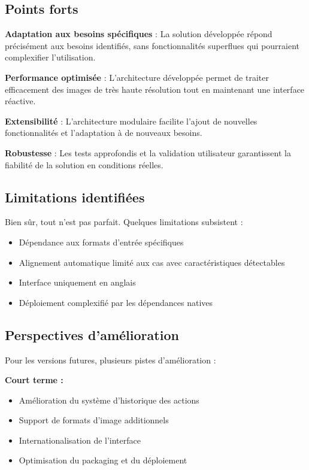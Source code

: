 \documentclass[11pt,a4paper]{report}
\begin{document}
\subsection{Points forts}

\textbf{Adaptation aux besoins spécifiques} : La solution développée répond précisément aux besoins identifiés, sans fonctionnalités superflues qui pourraient complexifier l'utilisation.

\textbf{Performance optimisée} : L'architecture développée permet de traiter efficacement des images de très haute résolution tout en maintenant une interface réactive.

\textbf{Extensibilité} : L'architecture modulaire facilite l'ajout de nouvelles fonctionnalités et l'adaptation à de nouveaux besoins.

\textbf{Robustesse} : Les tests approfondis et la validation utilisateur garantissent la fiabilité de la solution en conditions réelles.

\subsection{Limitations identifiées}

Bien sûr, tout n'est pas parfait. Quelques limitations subsistent :

\begin{itemize}
\item Dépendance aux formats d'entrée spécifiques
\item Alignement automatique limité aux cas avec caractéristiques détectables
\item Interface uniquement en anglais
\item Déploiement complexifié par les dépendances natives
\end{itemize}

\subsection{Perspectives d'amélioration}

Pour les versions futures, plusieurs pistes d'amélioration :

\textbf{Court terme :}
\begin{itemize}
\item Amélioration du système d'historique des actions
\item Support de formats d'image additionnels
\item Internationalisation de l'interface
\item Optimisation du packaging et du déploiement
\end{itemize}
\end{document}
